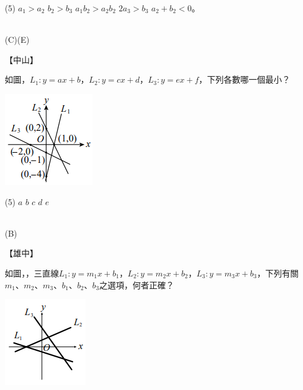 \documentclass
[answers]
{exam}
\theoremstyle{definition}
\begin{document}
\begin{questions}
\begin{tasks}(5)
	\task $a_1 > a_2$
	\task $b_2 > b_3$
	\task $a_1b_2 > a_2b_2$
	\task $2a_3 > b_3$
	\task $a_2 + b_2 < 0$。
\end{tasks}
\begin{solution}~\\
	(C)(E)
\end{solution}

\question
【中山】\\
\begin{minipage}[t]{0.7\linewidth}
	如圖，$L_1:y=ax+b$，$L_2:y=cx+d$，$L_3:y=ex+f$，下列各數哪一個最小？
\end{minipage}
\hfill
\begin{minipage}[t]{0.3\linewidth}
	\vspace*{-0.3cm}
	\includegraphics[scale=1]{./figure/13.png}
	\raggedleft %
\end{minipage}

\begin{tasks}(5)
	\task $a$
	\task $b$
	\task $c$
	\task $d$
	\task $e$
\end{tasks}
\begin{solution}~\\
	(B)
\end{solution}

\question
【雄中】\\
\begin{minipage}[t]{0.7\linewidth}
	如圖，，三直線$L_1:y=m_1x+b_1$，$L_2:y=m_2x+b_2$，$L_3:y=m_3x+b_3$，下列有關$m_1$、$m_2$、$m_3$、$b_1$、$b_2$、$b_3$之選項，何者正確？
\end{minipage}
\hfill
\begin{minipage}[t]{0.3\linewidth}
	\vspace*{-0.3cm}
	\includegraphics[scale=1]{./figure/14.png}
	\raggedleft %
\end{minipage}


\end{questions}
\end{document}
